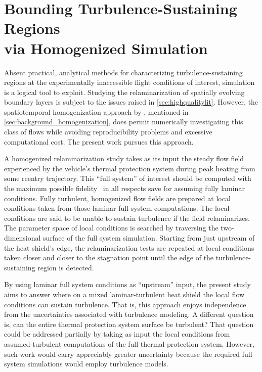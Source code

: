 \section[Bounding Turbulence-Sustaining Regions via Homogenized Simulation]
        {Bounding Turbulence-Sustaining Regions\\via Homogenized Simulation}
\label{sec:detectingrelaminarization}

Absent practical, analytical methods for characterizing turbulence-sustaining
regions at the experimentally inaccessible flight conditions of interest,
simulation is a logical tool to exploit.  Studying the relaminarization of
spatially evolving boundary layers is subject to the issues raised in
\autoref{sec:highqualitylit}.  However, the spatiotemporal homogenization
approach by \citet{Topalian2014Spatiotemporal}, mentioned in
\autoref{sec:background_homogenization}, does permit numerically investigating
this class of flows while avoiding reproducibility problems and excessive
computational cost.  The present work pursues this approach.

A homogenized relaminarization study takes as its input the steady flow field
experienced by the vehicle's thermal protection system during peak heating from
some reentry trajectory.  This ``full system'' of interest should be computed
with the maximum possible fidelity~\citep{Kirk2014Modeling,
Wright1996Dataparallel, Nompelis2005Parallel} in all respects save for assuming
fully laminar conditions.  Fully turbulent, homogenized flow fields are prepared
at local conditions taken from those laminar full system computations.  The
local conditions are said to be unable to sustain turbulence if the field
relaminarizes.  The parameter space of local conditions is searched by
traversing the two-dimensional surface of the full system simulation.  Starting
from just upstream of the heat shield's edge, the relaminarization tests are
repeated at local conditions taken closer and closer to the stagnation point
until the edge of the turbulence-sustaining region is detected.

By using laminar full system conditions as ``upstream'' input, the present
study aims to answer where on a mixed laminar-turbulent heat shield
the local flow conditions can sustain turbulence.  That is, this approach
enjoys independence from the uncertainties associated with turbulence modeling.
%
A different question is, can the entire thermal protection system
surface be turbulent?  That question could be addressed partially by taking as
input the local conditions from assumed-turbulent computations of the full
thermal protection system.  However, such work would carry appreciably greater
uncertainty because the required full system simulations would employ turbulence
models.

